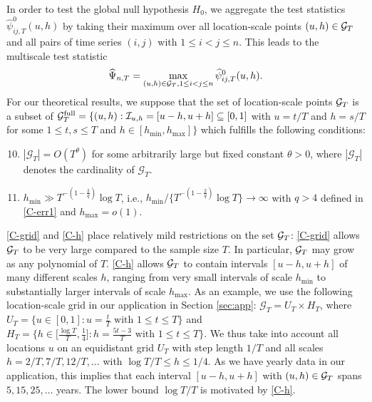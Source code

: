 \documentclass[12pt]{article}
\begin{document}
In order to test the global null hypothesis $H_0$, we aggregate the test statistics $\widehat{\psi}^0_{ij, T}(u, h)$ by taking their maximum over all location-scale points $(u,h) \in \mathcal{G}_T$ and all pairs of time series $(i,j)$ with $1 \le i < j \le n$. This leads to the multiscale test statistic 
\[ \widehat{\Psi}_{n,T} = \max_{(u,h) \in \mathcal{G}_T, 1 \le i < j \le n} \widehat{\psi}^0_{ij, T}(u, h). \]
For our theoretical results, we suppose that the set of location-scale points $\mathcal{G}_T$ is a subset of $\mathcal{G}_T^{\text{full}} = \{ (u, h): \mathcal{I}_{u, h} = [u-h,u+h] \subseteq [0,1]$ with $u = t/T$ and $h = s/T$  for some $1 \le t, s \le T$ and $h \in [h_{\min},h_{\max}] \}$ which fulfills the following conditions:
\begin{enumerate}[label=(C\arabic*),leftmargin=1.2cm, itemsep=0pt, parsep=0pt, topsep=3pt]
\setcounter{enumi}{9}

\item \label{C-grid} $|\mathcal{G}_T| = O(T^\theta)$ for some arbitrarily large but fixed constant $\theta > 0$, where $|\mathcal{G}_T|$ denotes the cardinality of $\mathcal{G}_T$. 

\item \label{C-h} $h_{\min} \gg T^{-(1-\frac{2}{q})} \log T$, i.e., $h_{\min} / \{ T^{-(1-\frac{2}{q})} \log T \} \rightarrow \infty$ with $q > 4$ defined in \ref{C-err1} and $h_{\max} = o(1)$.

\end{enumerate}
\ref{C-grid} and \ref{C-h} place relatively mild restrictions on the set $\mathcal{G}_T$: \ref{C-grid} allows $\mathcal{G}_T$ to be very large compared to the sample size $T$. In particular, $\mathcal{G}_T$ may grow as any polynomial of $T$. \ref{C-h} allows $\mathcal{G}_T$ to contain intervals $[u-h,u+h]$ of many different scales $h$, ranging from very small intervals of scale $h_{\min}$ to substantially larger intervals of scale $h_{\max}$.
As an example, we use the following location-scale grid in our application in Section \ref{sec:app}: $\mathcal{G}_T = U_T \times H_T$, where $U_T = \big\{ u \in [0,1]: u = \textstyle{\frac{t}{T}} \text{ with } 1 \le t \le T \big\}$ and $H_T = \big\{ h \in \big[ \textstyle{\frac{\log T}{T}}, \textstyle{\frac{1}{4}} \big]:  h = \textstyle{\frac{5t - 3}{T}} \text{ with } 1 \le t \le T \big\}$. We thus take into account all locations $u$ on an equidistant grid $U_T$ with step length $1/T$ and all scales $h=2/T, 7/T, 12/T,\ldots$ with $\log T /T \le h \le 1/4$. As we have yearly data in our application, this implies that each interval $[u-h,u+h]$ with $(u,h) \in \mathcal{G}_T$ spans $5, 15, 25, \ldots$ years. The lower bound $\log T / T$ is motivated by \ref{C-h}. 
\end{document}
